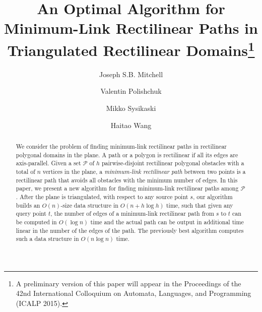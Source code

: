 \documentclass[english,runningheads,11pt]{llncs-revised}
\def\calP{\mathcal{P}}
\begin{document}
\title{An Optimal Algorithm for Minimum-Link Rectilinear Paths in Triangulated Rectilinear Domains\thanks{A preliminary version of
this paper will appear in the Proceedings of the 42nd International Colloquium on Automata, Languages, and Programming (ICALP 2015).
}
}

\author{Joseph S.B. Mitchell
\and
Valentin Polishchuk
\and
Mikko Sysikaski
\and
Haitao Wang
}



\maketitle

\pagestyle{plain}
\setcounter{page}{1}


\vspace{-0.2in}
\begin{abstract}
We consider the problem of finding minimum-link
rectilinear paths in rectilinear polygonal domains in the plane.
A path or a polygon is rectilinear if all its edges are axis-parallel.
Given a set $\calP$ of $h$ pairwise-disjoint rectilinear polygonal obstacles
with a total of $n$ vertices in the plane, a {\em minimum-link rectilinear
path} between two points is a rectilinear path that avoids all
obstacles with the minimum number of edges.
In this paper, we present a new algorithm for finding minimum-link rectilinear paths among $\calP$.
After the plane is triangulated, with respect to any source point $s$,  our algorithm
builds an $O(n)$-size data structure in $O(n+h\log h)$ time, such
that given any query point $t$, the number of edges of a minimum-link
rectilinear path from $s$ to $t$ can be computed in
$O(\log n)$ time and the actual path can be output in additional time
linear in the number of the edges of the path. The previously best algorithm
computes such a data structure in $O(n\log n)$ time.
\end{abstract}
\end{document}
